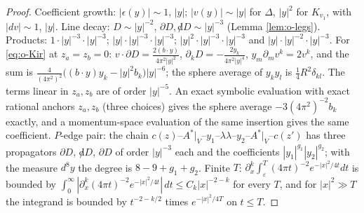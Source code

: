 \begin{proof}
Coefficient growth: $|\epsilon(y)|\sim1$, $|y|$; $|v(y)|\sim|y|$ for $\Delta$, $|y|^2$ for $K_{v_1}$, with $|dv|\sim1$, $|y|$. Line decay: $D\sim|y|^{-2}$, $\partial D,{\not d}D\sim|y|^{-3}$ (Lemma \ref{lem:o-legs}). Products: $1\cdot|y|^{-3}\cdot|y|^{-3}$; $|y|\cdot|y|^{-3}\cdot|y|^{-3}$; $|y|^2\cdot|y|^{-3}\cdot|y|^{-3}$ and $|y|\cdot|y|^{-2}\cdot|y|^{-3}$. For \eqref{eq:o-Kir} at $z_a=z_b=0$: $v\cdot\partial D=\tfrac{2(b\cdot y)}{4\pi^2|y|^2}$, $\partial_kD=-\tfrac{2y_k}{4\pi^2|y|^4}$, $y_m\partial_mv^k=2v^k$, and the sum is $\frac{4}{(4\pi^2)^2}\big((b\cdot y)y_k-|y|^2b_k\big)|y|^{-6}$; the sphere average of $y_ky_l$ is $\tfrac14R^2\delta_{kl}$. The terms linear in $z_a,z_b$ are of order $|y|^{-5}$. An exact symbolic evaluation with exact rational anchors $z_a,z_b$ (three choices) gives the sphere average $-3(4\pi^2)^{-2}b_k$ exactly, and a momentum-space evaluation of the same insertion gives the same coefficient. $P$-edge pair: the chain $c(z)$--$A^*|_V$--$y_1$--$\lambda\lambda$--$y_2$--$A^*|_V$--$c(z')$ has three propagators $\partial D$, ${\not d}D$, $\partial D$ of order $|y|^{-3}$ each and the coefficients $|y_1|^{g_1}|y_2|^{g_2}$; with the measure $d^8y$ the degree is $8-9+g_1+g_2$. Finite $T$: $\partial^k_x\int_\varepsilon^T(4\pi t)^{-2}e^{-|x|^2/4t}dt$ is bounded by $\int_0^\infty|\partial^k_x(4\pi t)^{-2}e^{-|x|^2/4t}|\,dt\le C_k|x|^{-2-k}$ for every $T$, and for $|x|^2\gg T$ the integrand is bounded by $t^{-2-k/2}$ times $e^{-|x|^2/4T}$ on $t\le T$.
\end{proof}

